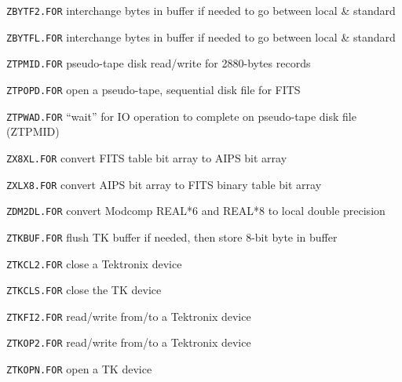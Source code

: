 {\medskip

\item{\tt ZBYTF2.FOR} interchange bytes in buffer if needed to go between
	local \& standard
\item{\tt ZBYTFL.FOR} interchange bytes in buffer if needed to go between
	local \& standard
\item{\tt ZTPMID.FOR} pseudo-tape disk read/write for 2880-bytes records
\item{\tt ZTPOPD.FOR} open a pseudo-tape, sequential disk file for FITS
\item{\tt ZTPWAD.FOR} ``wait'' for IO operation to complete on pseudo-tape
	disk file (ZTPMID)
\item{\tt ZX8XL.FOR} convert FITS table bit array to AIPS bit array
\item{\tt ZXLX8.FOR} convert AIPS bit array to FITS binary table bit array

\medskip

\item{\tt ZDM2DL.FOR} convert Modcomp REAL*6 and REAL*8 to local double precision

\medskip

\item{\tt ZTKBUF.FOR} flush TK buffer if needed, then store 8-bit byte in buffer
\item{\tt ZTKCL2.FOR} close a Tektronix device
\item{\tt ZTKCLS.FOR} close the TK device
\item{\tt ZTKFI2.FOR} read/write from/to a Tektronix device
\item{\tt ZTKOP2.FOR} read/write from/to a Tektronix device
\item{\tt ZTKOPN.FOR} open a TK device

\medskip

}
